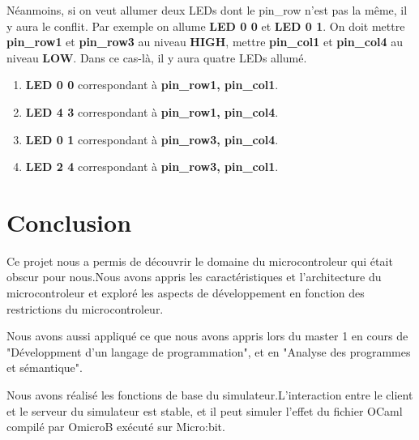 \documentclass[14px]{article}
\begin{document}
Néanmoins, si on veut allumer deux LEDs dont le pin\_row n'est pas la même, il y aura le conflit. Par exemple on allume \textbf{LED 0 0} et \textbf{LED 0 1}. On doit mettre \textbf{pin\_row1} et \textbf{pin\_row3} au niveau \textbf{HIGH}, mettre \textbf{pin\_col1} et \textbf{pin\_col4} au niveau \textbf{LOW}. Dans ce cas-là, il y aura quatre LEDs allumé.
\begin{enumerate}
	\item \textbf{LED 0 0} correspondant à \textbf{pin\_row1, pin\_col1}.
	\item \textbf{LED 4 3} correspondant à \textbf{pin\_row1, pin\_col4}.
	\item \textbf{LED 0 1} correspondant à \textbf{pin\_row3, pin\_col4}.
	\item \textbf{LED 2 4} correspondant à \textbf{pin\_row3, pin\_col1}.
\end{enumerate}
\begin{figure}[htbp]
\end{figure}

\section{Conclusion}
Ce projet nous a permis de découvrir le domaine du microcontroleur qui était obscur pour nous.Nous avons appris les caractéristiques et l'architecture du microcontroleur et exploré les aspects de développement en fonction des restrictions du microcontroleur.

Nous avons aussi appliqué ce que nous avons appris lors du master 1 en cours de "Développment d'un langage de programmation", et en "Analyse des programmes et sémantique".

Nous avons réalisé les fonctions de base du simulateur.L'interaction entre le client et le serveur du simulateur est stable, et il peut simuler l'effet du fichier OCaml compilé par OmicroB exécuté sur Micro:bit.
\end{document}
